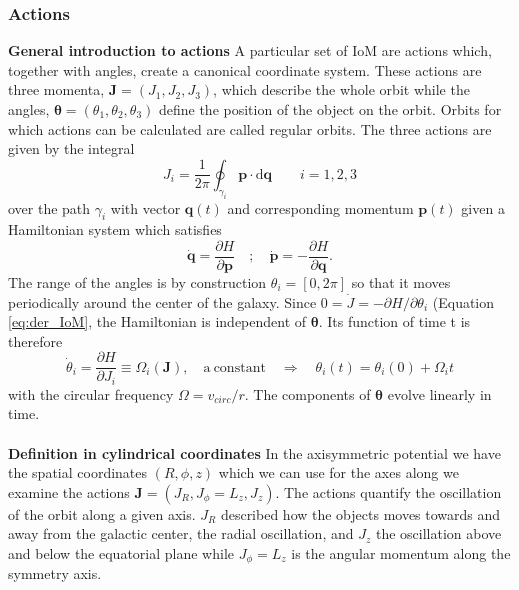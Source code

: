 \subsubsection{Actions}
\textbf{General introduction to actions} A particular set of \ac{IoM} are actions which, together with angles, create a canonical coordinate system. These actions are three momenta, $\mathbf{J} = (J_1, J_2, J_3)$, which describe the whole orbit while the angles, $\bm{\theta} = (\theta_1, \theta_2, \theta_3) $ define the position of the object on the orbit. Orbits for which actions can be calculated are called regular orbits. The three actions are given by the integral
\begin{equation}
    J_i = \frac{1}{2\pi}\oint_{\gamma_i}\mathbf{p}\cdot\mathrm{d}\mathbf{q} \qquad i = 1,2,3
\end{equation}
over the path $\gamma_i$ with vector $\mathbf{q}(t)$ and corresponding momentum $\mathbf{p}(t)$ given a Hamiltonian system which satisfies 
\begin{equation}
    \dot{\mathbf{q}} = \frac{\partial H}{\partial \mathbf{p}} \quad;\quad \dot{\mathbf{p}} = - \frac{\partial H}{\partial \mathbf{q}}. 
\end{equation}
The range of the angles is by construction $\theta_i = [0,2\pi]$ so that it moves periodically around the center of the galaxy. Since $0 = \dot{J} = -\partial H / \partial\theta_i$ (Equation \ref{eq:der_IoM}, the Hamiltonian is independent of $\bm{\theta}$. Its function of time t is therefore 
\begin{equation}
    \dot{\theta}_i = \frac{\partial H}{\partial J_i} \equiv \Omega_i(\mathbf{J}), \quad \mathrm{a\ constant} \quad \Rightarrow\quad \theta_i(t) = \theta_i(0) +  \Omega_i t
\end{equation}
with the circular frequency $\Omega = v_{circ}/r$. The components of $\bm{\theta}$ evolve linearly in time. 
\\\\\textbf{Definition in cylindrical coordinates} In the axisymmetric potential we have the spatial coordinates $(R, \phi, z)$ which we can use for the axes along we examine the actions $\mathbf{J} = (J_R, J_\phi = L_z, J_z)$. The actions quantify the oscillation of the orbit along a given axis. $J_R$ described how the objects moves towards and away from the galactic center, the radial oscillation, and $J_z$ the oscillation above and below the equatorial plane while $J_\phi = L_z$ is the angular momentum along the symmetry axis. 

